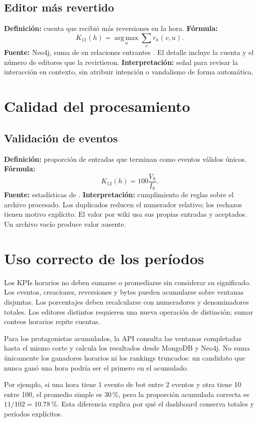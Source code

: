 \subsection{Editor más revertido}
\textbf{Definición:} cuenta que recibió más reversiones en la hora. \textbf{Fórmula:}
\[
K_{11}(h)=\operatorname*{arg\,max}_{u}\sum_{v}r_h(v,u).
\]
\textbf{Fuente:} Neo4j, suma de  en relaciones entrantes . El detalle incluye la cuenta y el número de editores que la revirtieron. \textbf{Interpretación:} señal para revisar la interacción en contexto, sin atribuir intención o vandalismo de forma automática.

\section{Calidad del procesamiento}
\subsection{Validación de eventos}
\textbf{Definición:} proporción de entradas que terminan como eventos válidos únicos. \textbf{Fórmula:}
\[
K_{12}(h)=100\frac{V_h}{I_h}.
\]
\textbf{Fuente:} estadísticas de . \textbf{Interpretación:} cumplimiento de reglas sobre el archivo procesado. Los duplicados reducen el numerador relativo; los rechazos tienen motivo explícito. El valor por wiki usa sus propias entradas y aceptados. Un archivo vacío produce valor ausente.

\section{Uso correcto de los períodos}
Los KPIs horarios no deben sumarse o promediarse sin considerar su significado. Los eventos, creaciones, reversiones y bytes pueden acumularse sobre ventanas disjuntas. Los porcentajes deben recalcularse con numeradores y denominadores totales. Los editores distintos requieren una nueva operación de distinción; sumar conteos horarios repite cuentas.

Para los protagonistas acumulados, la API consulta las ventanas completadas hasta el mismo corte y calcula los resultados desde MongoDB y Neo4j. No suma únicamente los ganadores horarios ni los rankings truncados: un candidato que nunca ganó una hora podría ser el primero en el acumulado.

Por ejemplo, si una hora tiene 1 evento de bot entre 2 eventos y otra tiene 10 entre 100, el promedio simple es 30\,\%, pero la proporción acumulada correcta es $11/102=10.78$\,\%. Esta diferencia explica por qué el dashboard conserva totales y períodos explícitos.
